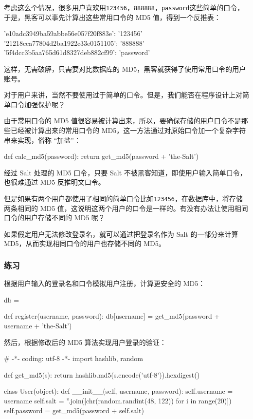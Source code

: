 考虑这么个情况，很多用户喜欢用\texttt{123456}，\texttt{888888}，\texttt{password}这些简单的口令，于是，黑客可以事先计算出这些常用口令的
MD5 值，得到一个反推表：

\begin{pythoncode}
'e10adc3949ba59abbe56e057f20f883e': '123456'
'21218cca77804d2ba1922c33e0151105': '888888'
'5f4dcc3b5aa765d61d8327deb882cf99': 'password'
\end{pythoncode}

这样，无需破解，只需要对比数据库的
MD5，黑客就获得了使用常用口令的用户账号。

对于用户来讲，当然不要使用过于简单的口令。但是，我们能否在程序设计上对简单口令加强保护呢？

由于常用口令的 MD5
值很容易被计算出来，所以，要确保存储的用户口令不是那些已经被计算出来的常用口令的
MD5，这一方法通过对原始口令加一个复杂字符串来实现，俗称 ``加盐''：

\begin{pythoncode}
def calc_md5(password):
    return get_md5(password + 'the-Salt')
\end{pythoncode}

经过 Salt 处理的 MD5 口令，只要 Salt
不被黑客知道，即使用户输入简单口令，也很难通过 MD5 反推明文口令。

但是如果有两个用户都使用了相同的简单口令比如\texttt{123456}，在数据库中，将存储两条相同的
MD5
值，这说明这两个用户的口令是一样的。有没有办法让使用相同口令的用户存储不同的
MD5 呢？

如果假定用户无法修改登录名，就可以通过把登录名作为 Salt 的一部分来计算
MD5，从而实现相同口令的用户也存储不同的 MD5。

\hypertarget{ux7ec3ux4e60-1}{%
\subsubsection{练习}\label{ux7ec3ux4e60-1}}

根据用户输入的登录名和口令模拟用户注册，计算更安全的 MD5：

\begin{pythoncode}
db = {}

def register(username, password):
    db[username] = get_md5(password + username + 'the-Salt')
\end{pythoncode}

然后，根据修改后的 MD5 算法实现用户登录的验证：

\begin{pythoncode}
# -*- coding: utf-8 -*-
import hashlib, random

def get_md5(s):
    return hashlib.md5(s.encode('utf-8')).hexdigest()

class User(object):
    def __init__(self, username, password):
        self.username = username
        self.salt = ''.join([chr(random.randint(48, 122)) for i in range(20)])
        self.password = get_md5(password + self.salt)
\end{pythoncode}

